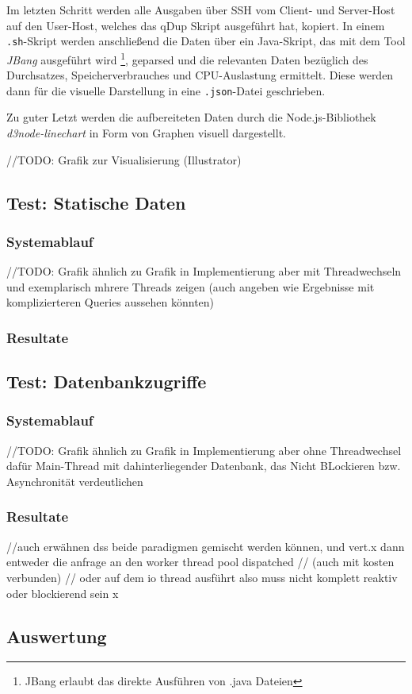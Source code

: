 Im letzten Schritt werden alle Ausgaben über SSH vom Client- und Server-Host auf den User-Host, welches das qDup Skript ausgeführt hat, kopiert.
In einem \verb|.sh|-Skript werden anschließend die Daten über ein Java-Skript, das mit dem Tool \textit{JBang} ausgeführt
wird \footnote{JBang erlaubt das direkte Ausführen von .java Dateien},
geparsed und die relevanten Daten bezüglich des Durchsatzes, Speicherverbrauches und CPU-Auslastung ermittelt.
Diese werden dann für die visuelle Darstellung in eine \verb|.json|-Datei geschrieben.

Zu guter Letzt werden die aufbereiteten Daten durch die Node.js-Bibliothek \textit{d3node-linechart} in Form von Graphen visuell dargestellt.

//TODO: Grafik zur Visualisierung (Illustrator)
\subsection{Test: Statische Daten}
\label{section:statische_daten}

\subsubsection{Systemablauf}
//TODO: Grafik ähnlich zu Grafik in Implementierung aber mit Threadwechseln und exemplarisch mhrere Threads zeigen
(auch angeben wie Ergebnisse mit komplizierteren Queries aussehen könnten)
\subsubsection{Resultate}

\subsection{Test: Datenbankzugriffe}
\label{section:datenbankzugriffe}

\subsubsection{Systemablauf}
//TODO: Grafik ähnlich zu Grafik in Implementierung aber ohne Threadwechsel dafür Main-Thread mit dahinterliegender Datenbank,
das Nicht BLockieren bzw. Asynchronität verdeutlichen

\subsubsection{Resultate}

//auch erwähnen dss beide paradigmen gemischt werden können, und vert.x dann entweder die anfrage an den worker thread pool dispatched
// (auch mit kosten verbunden)
// oder auf dem io thread ausführt also muss nicht komplett reaktiv oder blockierend sein x
\subsection{Auswertung}

\label{section:auswertung}